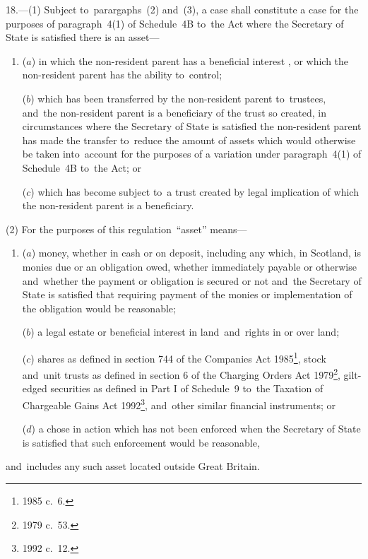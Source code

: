 \documentclass[12pt,a4paper]{article}
\begin{document}
18.---(1)  Subject to~parargaphs~(2) and~(3), a case shall constitute a case for the purposes of paragraph~4(1) of Schedule~4B to~the Act where the Secretary of State is satisfied there is an asset—
\begin{enumerate}\item[]
($a$) in which the non-resident parent 
has a beneficial interest%
, or which the non-resident parent has the ability to~control;

($b$) which has been transferred by the non-resident parent to~trustees, and~the non-resident parent is a beneficiary of the trust so created, in circumstances where the Secretary of State is satisfied the non-resident parent has made the transfer to~reduce the amount of assets which would otherwise be taken into~account for the purposes of a variation under paragraph~4(1) of Schedule~4B to~the Act; or

($c$) which has become subject to~a trust created by legal implication of which the non-resident parent is a beneficiary.
\end{enumerate}

(2) For the purposes of this regulation~“asset” means—
\begin{enumerate}\item[]
($a$) money, whether in cash or on deposit, including any which, in Scotland, is monies due or an obligation owed, whether immediately payable or otherwise and~whether the payment or obligation is secured or not and~the Secretary of State is satisfied that requiring payment of the monies or implementation of the obligation would be reasonable;

($b$) a legal estate or beneficial interest in land~and~rights in or over land;

($c$) shares as defined in section 744 of the Companies Act 1985\footnote{1985 c.\ 6.}, stock and~unit trusts as defined in section 6 of the Charging Orders Act 1979\footnote{1979 c.\ 53.}, gilt-edged securities as defined in Part I of Schedule~9 to~the Taxation of Chargeable Gains Act 1992\footnote{1992 c.\ 12.}, and~other similar financial instruments; or

($d$) a chose in action which has not been enforced when the Secretary of State is satisfied that such enforcement would be reasonable,
\end{enumerate}
and~includes any such asset located outside Great Britain.
\end{document}
